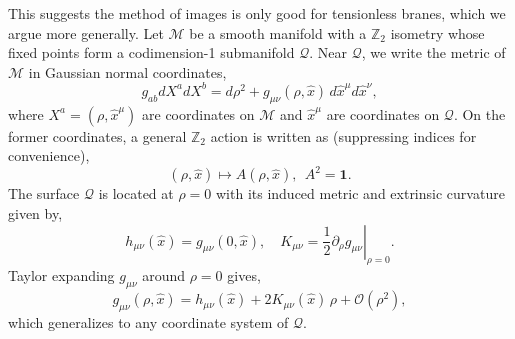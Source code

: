 \documentclass[reprint,amsmath,amssymb,aps,nofootinbib,twocolumn]{revtex4-2}
\begin{document}
\begin{appendix}
This suggests the method of images is only good for tensionless branes, which we argue more generally. Let $ \mathcal{M} $ be a smooth manifold with a $ \mathbb{Z}_2$ isometry whose fixed points form a codimension-1 submanifold $ \mathcal{Q} $. Near $ \mathcal{Q} $, we write the metric of $ \mathcal{M} $ in Gaussian normal coordinates,
\begin{equation}
g_{ab}dX^{a}dX^{b} = d\rho^{2} + g_{\mu\nu}(\rho,\hat{x})\,d\hat{x}^{\mu}d\hat{x}^{\nu},
\end{equation}
where $ X^{a} = (\rho,\hat{x}^{\mu}) $ are coordinates on $ \mathcal{M} $ and $\hat{x}^{\mu} $ are coordinates on $ \mathcal{Q} $.
On the former coordinates, a general $\mathbb{Z}_2$ action is written as (suppressing indices for convenience),
\begin{equation}
(\rho,\hat{x}) \mapsto A(\rho,\hat{x}),\ \ A^2 = \textbf{1}.\label{actionA}
\end{equation}
The surface $ \mathcal{Q} $ is located at $ \rho = 0 $ with its induced metric and extrinsic curvature given by,
\begin{equation}
h_{\mu\nu}(\hat{x}) = g_{\mu\nu}(0,\hat{x}), \quad K_{\mu\nu} = \left.\frac{1}{2}\partial_{\rho}g_{\mu\nu}\right|_{\rho = 0}.
\end{equation}
Taylor expanding $ g_{\mu\nu} $ around $ \rho = 0 $ gives,
\begin{equation}
g_{\mu\nu}(\rho,\hat{x}) =  h_{\mu\nu}(\hat{x}) + 2K_{\mu\nu}(\hat{x})\,\rho + \mathcal{O}(\rho^{2}),
\label{taylorg}
\end{equation}
which generalizes to any coordinate system of $ \mathcal{Q} $.

\begin{figure}
\centering
{}
\end{figure}
\end{appendix}
\end{document}
